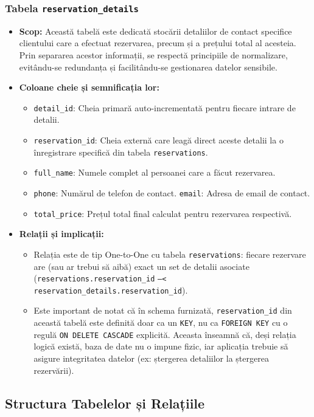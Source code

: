 \documentclass[12pt, a4paper, oneside, romanian]{teza-upb}
\begin{document}
\subsubsection{Tabela \texttt{reservation\_details}}
\begin{itemize}
	\item \textbf{Scop:} Această tabelă este dedicată stocării detaliilor de contact specifice clientului care a efectuat rezervarea, precum și a prețului total al acesteia. Prin separarea acestor informații, se respectă principiile de normalizare, evitându-se redundanța și facilitându-se gestionarea datelor sensibile.
	\item \textbf{Coloane cheie și semnificația lor:}
	\begin{itemize}
		\item \texttt{detail\_id}: Cheia primară auto-incrementată pentru fiecare intrare de detalii.
		\item \texttt{reservation\_id}: Cheia externă care leagă direct aceste detalii la o înregistrare specifică din tabela \texttt{reservations}.
		\item \texttt{full\_name}: Numele complet al persoanei care a făcut rezervarea.
		\item \texttt{phone}: Numărul de telefon de contact.
		\texttt{email}: Adresa de email de contact.
		\item \texttt{total\_price}: Prețul total final calculat pentru rezervarea respectivă.
	\end{itemize}
	\item \textbf{Relații și implicații:}
	\begin{itemize}
		\item Relația este de tip One-to-One cu tabela \texttt{reservations}: fiecare rezervare are (sau ar trebui să aibă) exact un set de detalii asociate (\texttt{reservations.reservation\_id} \texttt{--<} \texttt{reservation\_details.reservation\_id}).
		\item Este important de notat că în schema furnizată, \texttt{reservation\_id} din această tabelă este definită doar ca un \texttt{KEY}, nu ca \texttt{FOREIGN KEY} cu o regulă \texttt{ON DELETE CASCADE} explicită. Aceasta înseamnă că, deși relația logică există, baza de date nu o impune fizic, iar aplicația trebuie să asigure integritatea datelor (ex: ștergerea detaliilor la ștergerea rezervării).
	\end{itemize}
\end{itemize}


\subsection{Structura Tabelelor și Relațiile}
\end{document}
